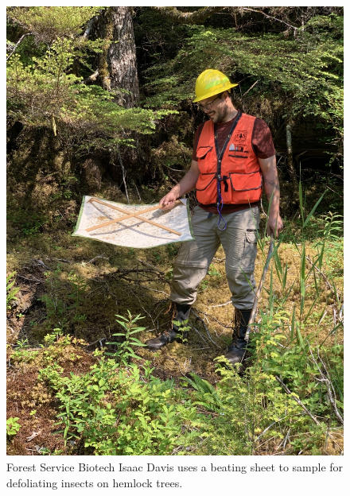 \begin{multicols}{2}
  
\begin{figure}[H]
\begin{center}
\vspace{2mm}
\includegraphics[width=\textwidth]{img/beating_sheet.jpg}
\caption{Forest Service Biotech Isaac Davis uses a beating sheet to sample for defoliating insects on hemlock trees.}
\label{beating_sheet}
\end{center}
\end{figure} 


\end{multicols}
